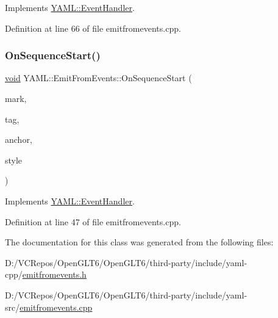 Implements \mbox{\hyperlink{class_y_a_m_l_1_1_event_handler_a8b36cc36cd7067175b80b5d047aafaf3}{Y\+A\+M\+L\+::\+Event\+Handler}}.



Definition at line 66 of file emitfromevents.\+cpp.

\mbox{\label{class_y_a_m_l_1_1_emit_from_events_a9c1a257badc0b9631ee52aed5755cd16}} 
\subsubsection{\texorpdfstring{OnSequenceStart()}{OnSequenceStart()}}
{\footnotesize\ttfamily \mbox{\hyperlink{glad_8h_a950fc91edb4504f62f1c577bf4727c29}{void}} Y\+A\+M\+L\+::\+Emit\+From\+Events\+::\+On\+Sequence\+Start (\begin{DoxyParamCaption}\item[{const \mbox{\hyperlink{struct_y_a_m_l_1_1_mark}{Mark}} \&}]{mark,  }\item[{const \mbox{\hyperlink{glad_8h_ac83513893df92266f79a515488701770}{std\+::string}} \&}]{tag,  }\item[{\mbox{\hyperlink{namespace_y_a_m_l_abeff1798814ae3402fc5665fdcad1de6}{anchor\+\_\+t}}}]{anchor,  }\item[{\mbox{\hyperlink{struct_y_a_m_l_1_1_emitter_style_ae86640662c85ce6062a37f9636b6959f}{Emitter\+Style\+::value}}}]{style }\end{DoxyParamCaption})\hspace{0.3cm}{\ttfamily [virtual]}}



Implements \mbox{\hyperlink{class_y_a_m_l_1_1_event_handler_adf7a5e4ccf638b656009525556412ab5}{Y\+A\+M\+L\+::\+Event\+Handler}}.



Definition at line 47 of file emitfromevents.\+cpp.



The documentation for this class was generated from the following files\+:\begin{DoxyCompactItemize}
\item 
D\+:/\+V\+C\+Repos/\+Open\+G\+L\+T6/\+Open\+G\+L\+T6/third-\/party/include/yaml-\/cpp/\mbox{\hyperlink{emitfromevents_8h}{emitfromevents.\+h}}\item 
D\+:/\+V\+C\+Repos/\+Open\+G\+L\+T6/\+Open\+G\+L\+T6/third-\/party/include/yaml-\/src/\mbox{\hyperlink{emitfromevents_8cpp}{emitfromevents.\+cpp}}\end{DoxyCompactItemize}
